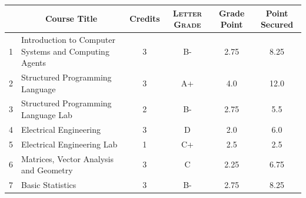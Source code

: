 \documentclass[11pt]{article}
\newcommand*{\numtwo}[1]{\pgfmathprintnumber[
                    fixed, precision=2, fixed zerofill=true]{#1}}
\begin{document}
                \begin{center}
                    \renewcommand{\arraystretch}{1.08}
                    
                \begin{tabular}{|c|l|c|>{\scshape}c|c|c|}
                \hline  \rule[-1ex]{0pt}{3.5ex} {\centering{\bf Course Code}} &  \multicolumn{1}{c|}{\textbf{Course Title}}  & {\bf Credits} & {\bf Letter Grade} & {\bf Grade Point} & {\bf Point Secured}  \\ 
                \hline   1 &  Introduction to Computer Systems and Computing Agents		 & 3 & B- & 2.75 & 8.25 \\ %
                \hline   2 &  Structured Programming Language		 & 3 & A+ & 4.0 & 12.0 \\ %
                \hline   3 &  Structured Programming Language Lab		 & 2 & B- & 2.75 & 5.5 \\ %
                \hline   4 &  Electrical Engineering		 & 3 & D & 2.0 & 6.0 \\ %
                \hline   5 &  Electrical Engineering Lab		 & 1 & C+ & 2.5 & 2.5 \\ %
                \hline   6 &  Matrices, Vector Analysis and Geometry		 & 3 & C & 2.25 & 6.75 \\ %
                \hline   7 &  Basic Statistics		 & 3 & B- & 2.75 & 8.25 \\ %

\hline                %
                \end{tabular}
                \end{center}
                \renewcommand{\arraystretch}{1.03}
\end{document}
